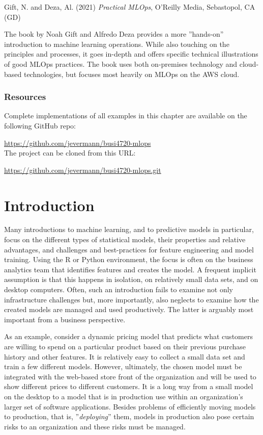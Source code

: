 \begin{tcolorbox}[colback=alert]
Gift, N. and Deza, Al. (2021) \emph{Practical MLOps}, O'Reilly Media, Sebastopol, CA (GD)
\end{tcolorbox}

The book by Noah Gift and Alfredo Deza provides a more ''hands-on'' introduction to machine learning operations. While also touching on the principles and processes, it goes in-depth and offers specific technical illustrations of good MLOps practices. The book uses both on-premises technology and cloud-based technologies, but focuses most heavily on MLOps on the AWS cloud. 


\begin{tcolorbox}[colback=alert]
\subsubsection*{Resources}
Complete implementations of all examples in this chapter are available on the following GitHub repo:

\url{https://github.com/jevermann/busi4720-mlops} \\

The project can be cloned from this URL:

\url{https://github.com/jevermann/busi4720-mlops.git}
\end{tcolorbox}


\section{Introduction}

Many introductions to machine learning, and to predictive models in particular, focus on the different types of statistical models, their properties and relative advantages, and challenges and best-practices for feature engineering and model training. Using the R or Python environment, the focus is often on the business analytics team that identifies features and creates the model. A frequent implicit assumption is that this happens in isolation, on relatively small data sets, and on desktop computers. Often, such an introduction fails to examine not only infrastructure challenges but, more importantly, also neglects to examine how the created models are managed and used productively. The latter is arguably most important from a business perspective.

As an example, consider a dynamic pricing model that predicts what customers are willing to spend on a particular product based on their previous purchase history and other features. It is relatively easy to collect a small data set and train a few different models. However, ultimately, the chosen model must be integrated with the web-based store front of the organization and will be used to show different prices to different customers. It is a long way from a small model on the desktop to a model that is in production use within an organization's larger set of software applications. Besides problems of efficiently moving models to production, that is, ''\emph{deploying}'' them, models in production also pose certain risks to an organization and these risks must be managed. 

